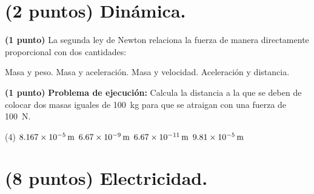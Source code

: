 \documentclass[12pt, letter]{exam}
\begin{document}


\newpage

\begin{questions}
    \section{(2 puntos) Dinámica.}

    \question \textbf{(1 punto)} La segunda ley de Newton relaciona la fuerza de manera directamente proporcional con dos cantidades:
    \begin{multicols}{2}
    \begin{tasks}
        \task Masa y peso.
        \task Masa y aceleración.
        \task Masa y velocidad.
        \task Aceleración y distancia.
    \end{tasks}
    \end{multicols}
    \question \textbf{(1 punto)} \label{Problema_01} \textbf{Problema de ejecución: } Calcula la distancia a la que se deben de colocar dos masas iguales de \SI{100}{\kilo\gram} para que se atraigan con una fuerza de \SI{100}{\newton}.
    \begin{tasks}(4)
        \task $\SI{8.167d-5}{\meter}$
        \task $\SI{6.67d-9}{\meter}$
        \task $\SI{6.67d-11}{\meter}$
        \task $\SI{9.81d-5}{\meter}$
    \end{tasks}

    \section{(8 puntos) Electricidad.}


\end{questions}
\end{document}
